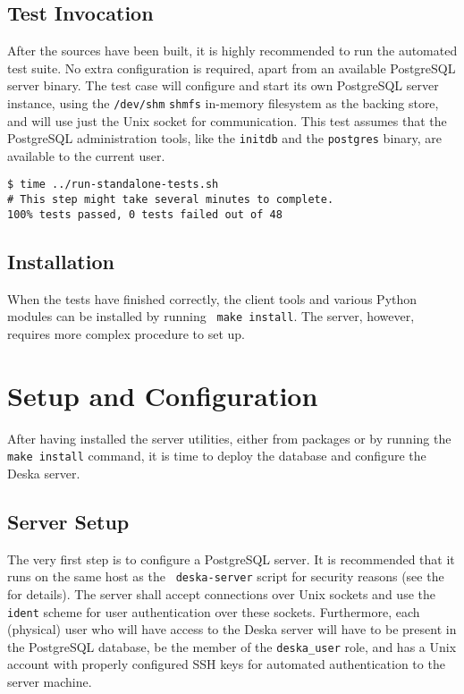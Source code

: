 \documentclass[deska]{subfiles}
\begin{document}
\subsection{Test Invocation}

After the sources have been built, it is highly recommended to run the automated test suite.  No extra configuration is
required, apart from an available PostgreSQL server binary.  The test case will configure and start its own PostgreSQL
server instance, using the {\tt /dev/shm} {\tt shmfs} in-memory filesystem as the backing store, and will use just the
Unix socket for communication.  This test assumes that the PostgreSQL administration tools, like the {\tt initdb} and
the {\tt postgres} binary, are available to the current user.

\begin{verbatim}
$ time ../run-standalone-tests.sh
# This step might take several minutes to complete.
100% tests passed, 0 tests failed out of 48
\end{verbatim}

\subsection{Installation}

When the tests have finished correctly, the client tools and various Python modules can be installed by running {\tt
make install}.  The server, however, requires more complex procedure to set up.

\section{Setup and Configuration}
\label{sec:build-server-setup}

After having installed the server utilities, either from packages or by running the {\tt make install} command, it is
time to deploy the database and configure the Deska server.

\subsection{Server Setup}

The very first step is to configure a PostgreSQL server.  It is recommended that it runs on the same host as the {\tt
deska-server} script for security reasons (see the  for details).  The server shall
accept connections over Unix sockets and use the {\tt ident} scheme for user authentication over these sockets.
Furthermore, each (physical) user who will have access to the Deska server will have to be present in the PostgreSQL
database, be the member of the {\tt deska\_user} role, and has a Unix account with properly configured SSH keys for
automated authentication to the server machine.
\end{document}
